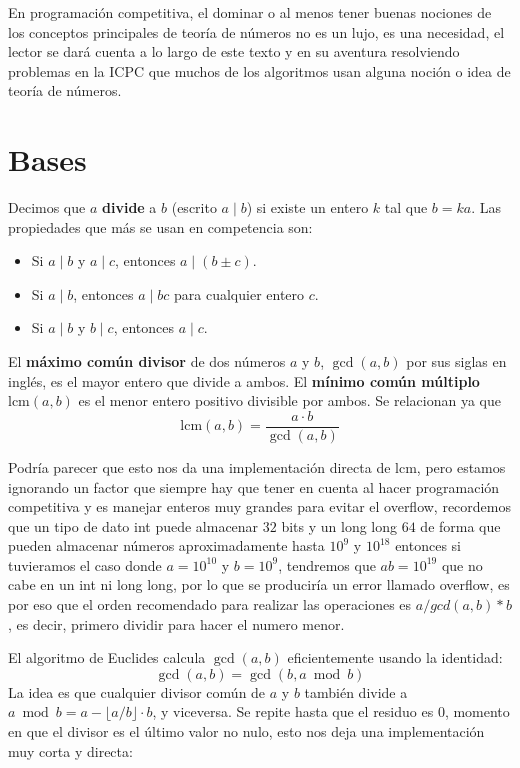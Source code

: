 En programación competitiva, el dominar o al menos tener buenas nociones de los conceptos principales de teoría de números no es un lujo, es una necesidad, el lector se dará cuenta a lo largo de este texto y en su aventura resolviendo problemas en la ICPC que muchos de los algoritmos usan alguna noción o idea de teoría de números.
\section{Bases}
Decimos que $a$ \textbf{divide} a $b$ (escrito $a \mid b$) si existe un entero $k$ tal que $b = ka$. Las propiedades que más se usan en competencia son:
 
\begin{itemize}
    \item Si $a \mid b$ y $a \mid c$, entonces $a \mid (b \pm c)$.
    \item Si $a \mid b$, entonces $a \mid bc$ para cualquier entero $c$.
    \item Si $a \mid b$ y $b \mid c$, entonces $a \mid c$.
\end{itemize}


El \textbf{máximo común divisor} de dos números $a$ y $b$, $\gcd(a,b)$ por sus siglas en inglés, es el mayor entero que divide a ambos. El \textbf{mínimo común múltiplo} $\text{lcm}(a,b)$ es el menor entero positivo divisible por ambos. Se relacionan ya que
\[
\text{lcm}(a,b) = \frac{a \cdot b}{\gcd(a,b)}
\]

Podría parecer que esto nos da una implementación directa de $\text{lcm}$, pero estamos ignorando un factor que siempre hay que tener en cuenta al hacer programación competitiva y es manejar enteros muy grandes para evitar el overflow, recordemos que un tipo de dato int puede almacenar $32$ bits y un long long $64$ de forma que pueden almacenar números aproximadamente hasta $10^9$ y $10^{18}$ entonces si tuvieramos el caso donde $a=10^{10}$ y $b=10^9$, tendremos que $ab=10^{19}$ que no cabe en un int ni long long, por lo que se produciría un error llamado overflow, es por eso que el orden recomendado para realizar las operaciones es \texttt{$a / gcd(a,b) * b$}, es decir, primero dividir para hacer el numero menor.

El algoritmo de Euclides calcula $\gcd(a,b)$ eficientemente usando la identidad:
\[
\gcd(a, b) = \gcd(b, a \bmod b)
\]
La idea es que cualquier divisor común de $a$ y $b$ también divide a $a \bmod b = a - \lfloor a/b \rfloor \cdot b$, y viceversa. Se repite hasta que el residuo es $0$, momento en que el divisor es el último valor no nulo, esto nos deja una implementación muy corta y directa:
 
